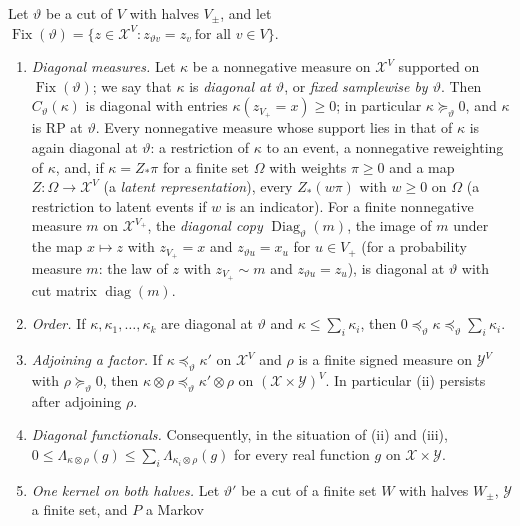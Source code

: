 \begin{lemma}\label{lem:commoncut}
Let $\vartheta$ be a cut of $V$ with halves $V_\pm$, and let
$\operatorname{Fix}(\vartheta)=\{z\in\mathcal X^V:z_{\vartheta v}=z_v\ \text{for
all }v\in V\}$.
\begin{enumerate}[label=(\roman*)]
\item \emph{Diagonal measures.} Let $\kappa$ be a nonnegative measure on
 $\mathcal X^V$ supported on $\operatorname{Fix}(\vartheta)$; we say that
 $\kappa$ is \emph{diagonal at $\vartheta$}, or \emph{fixed samplewise by
 $\vartheta$}. Then $C_\vartheta(\kappa)$ is diagonal with entries
 $\kappa(z_{V_+}=x)\ge0$; in particular $\kappa\succeq_\vartheta0$, and $\kappa$
 is RP at $\vartheta$. Every nonnegative measure whose support lies in that of
 $\kappa$ is again diagonal at $\vartheta$: a restriction of $\kappa$ to an
 event, a nonnegative reweighting of $\kappa$, and, if $\kappa=Z_*\pi$ for a
 finite set $\Omega$ with weights $\pi\ge0$ and a map
 $Z\colon\Omega\to\mathcal X^V$ (a \emph{latent representation}), every
 $Z_*(w\pi)$ with $w\ge0$ on $\Omega$ (a restriction to latent events if $w$ is
 an indicator). For a finite nonnegative measure $m$ on $\mathcal X^{V_+}$,
 the \emph{diagonal copy} $\operatorname{Diag}_\vartheta(m)$, the image of $m$
 under the map $x\mapsto z$ with $z_{V_+}=x$ and $z_{\vartheta u}=x_u$ for
 $u\in V_+$ (for a probability measure $m$: the law of $z$ with $z_{V_+}\sim m$
 and $z_{\vartheta u}=z_u$), is diagonal at $\vartheta$ with cut matrix
 $\operatorname{diag}(m)$.
\item \emph{Order.} If $\kappa,\kappa_1,\dots,\kappa_k$ are diagonal at
 $\vartheta$ and $\kappa\le\sum_i\kappa_i$, then
 $0\preceq_\vartheta\kappa\preceq_\vartheta\sum_i\kappa_i$.
\item \emph{Adjoining a factor.} If $\kappa\preceq_\vartheta\kappa'$ on
 $\mathcal X^V$ and $\rho$ is a finite signed measure on $\mathcal Y^V$ with
 $\rho\succeq_\vartheta0$, then $\kappa\otimes\rho\preceq_\vartheta\kappa'\otimes\rho$
 on $(\mathcal X\times\mathcal Y)^V$. In particular (ii) persists after
 adjoining $\rho$.
\item \emph{Diagonal functionals.} Consequently, in the situation of (ii) and
 (iii), $0\le\Lambda_{\kappa\otimes\rho}(g)\le\sum_i\Lambda_{\kappa_i\otimes\rho}(g)$
 for every real function $g$ on $\mathcal X\times\mathcal Y$.
\item \emph{One kernel on both halves.} Let $\vartheta'$ be a cut of a finite
 set $W$ with halves $W_\pm$, $\mathcal Y$ a finite set, and $P$ a Markov

\end{enumerate}
\end{lemma}
